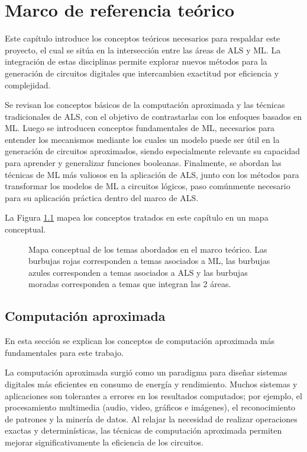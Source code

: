 \chapter{Marco de referencia teórico}

Este capítulo introduce los conceptos teóricos necesarios para respaldar este
proyecto, el cual se sitúa en la intersección entre las áreas de ALS y ML. La
integración de estas disciplinas permite explorar nuevos métodos para la
generación de circuitos digitales que intercambien exactitud por eficiencia y
complejidad.

Se revisan los conceptos básicos de la computación aproximada y las técnicas
tradicionales de ALS, con el objetivo de contrastarlas con los enfoques basados
en ML. Luego se introducen conceptos fundamentales de ML, necesarios para
entender los mecanismos mediante los cuales un modelo puede ser útil en la
generación de circuitos aproximados, siendo especialmente relevante su
capacidad para aprender y generalizar funciones booleanas. Finalmente, se
abordan las técnicas de ML más valiosos en la aplicación de ALS, junto con
los métodos para transformar los modelos de ML a circuitos lógicos, paso
comúnmente necesario para su aplicación práctica dentro del marco de ALS.

La Figura \ref{fig:mapa_conceptual} mapea los conceptos tratados en
este capítulo en un mapa conceptual.

\begin{figure}[ht]
  \centering
  
  \caption{Mapa conceptual de los temas abordados en el marco teórico. Las
    burbujas rojas corresponden a temas asociados a ML, las burbujas azules
    corresponden a temas asociados a ALS y las burbujas moradas corresponden a
  temas que integran las 2 áreas.}
  \label{fig:mapa_conceptual}
\end{figure}

\section{Computación aproximada}

En esta sección se explican los conceptos de computación aproximada más
fundamentales para este trabajo.

La computación aproximada surgió como un paradigma para diseñar sistemas
digitales más eficientes en consumo de energía y rendimiento. Muchos sistemas y
aplicaciones son tolerantes a errores en los resultados computados; por
ejemplo, el procesamiento multimedia (audio, video, gráficos e imágenes), el
reconocimiento de patrones y la minería de datos. Al relajar la necesidad de
realizar operaciones exactas y determinísticas, las técnicas de computación
aproximada permiten mejorar significativamente la eficiencia de los circuitos.
\cite{han_approximate_2013}

